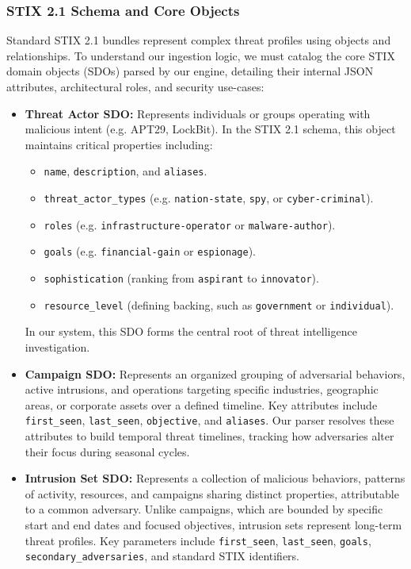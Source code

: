 \subsubsection{STIX 2.1 Schema and Core Objects}
Standard STIX 2.1 bundles represent complex threat profiles using objects and relationships. To understand our ingestion logic, we must catalog the core STIX domain objects (SDOs) parsed by our engine, detailing their internal JSON attributes, architectural roles, and security use-cases:
\begin{itemize}
    \item \textbf{Threat Actor SDO:} Represents individuals or groups operating with malicious intent (e.g. APT29, LockBit). In the STIX 2.1 schema, this object maintains critical properties including:
    \begin{itemize}
        \item \texttt{name}, \texttt{description}, and \texttt{aliases}.
        \item \texttt{threat\_actor\_types} (e.g. \texttt{nation-state}, \texttt{spy}, or \texttt{cyber-criminal}).
        \item \texttt{roles} (e.g. \texttt{infrastructure-operator} or \texttt{malware-author}).
        \item \texttt{goals} (e.g. \texttt{financial-gain} or \texttt{espionage}).
        \item \texttt{sophistication} (ranking from \texttt{aspirant} to \texttt{innovator}).
        \item \texttt{resource\_level} (defining backing, such as \texttt{government} or \texttt{individual}).
    \end{itemize}
    In our system, this SDO forms the central root of threat intelligence investigation.
    \item \textbf{Campaign SDO:} Represents an organized grouping of adversarial behaviors, active intrusions, and operations targeting specific industries, geographic areas, or corporate assets over a defined timeline. Key attributes include \texttt{first\_seen}, \texttt{last\_seen}, \texttt{objective}, and \texttt{aliases}. Our parser resolves these attributes to build temporal threat timelines, tracking how adversaries alter their focus during seasonal cycles.
    \item \textbf{Intrusion Set SDO:} Represents a collection of malicious behaviors, patterns of activity, resources, and campaigns sharing distinct properties, attributable to a common adversary. Unlike campaigns, which are bounded by specific start and end dates and focused objectives, intrusion sets represent long-term threat profiles. Key parameters include \texttt{first\_seen}, \texttt{last\_seen}, \texttt{goals}, \texttt{secondary\_adversaries}, and standard STIX identifiers.

\end{itemize}
